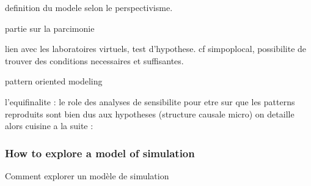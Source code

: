 definition du modele selon le perspectivisme.

partie sur la parcimonie

lien avec les laboratoires virtuels, test d'hypothese. cf simpoplocal, possibilite de trouver des conditions necessaires et suffisantes.


pattern oriented modeling \cite{grimm2005pattern}

l'equifinalite : le role des analyses de sensibilite pour etre sur que les patterns reproduits sont bien dus aux hypotheses (structure causale micro)
on detaille alors cuisine a la suite :










\subsubsection{How to explore a model of simulation}{Comment explorer un modèle de simulation}


